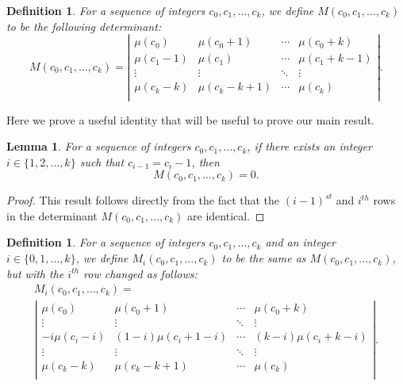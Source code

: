 \documentclass[12pt]{amsart}
\newtheorem{definition}[theorem]{Definition}
\newtheorem{lemma}[theorem]{Lemma}
\newcommand{\ifact}{\mu}
\newcommand{\M}{M}
\begin{document}
\begin{definition}
For a sequence of integers $c_0, c_1, \dots, c_k$, we define $\M(c_0, c_1, \dots, c_k)$ to be the following determinant:
$$
\M(c_0, c_1, \dots, c_k) = \left|
\begin{matrix}
\ifact(c_0) & \ifact(c_0+1) & \cdots & \ifact(c_0+k) \\
\ifact(c_1-1) & \ifact(c_1) & \cdots & \ifact(c_1+k-1) \\
\vdots & \vdots & \ddots & \vdots \\
\ifact(c_k-k) & \ifact(c_k-k+1) & \cdots & \ifact(c_k) \\
\end{matrix} \right|.
$$
\end{definition}

Here we prove a useful identity that will be useful to prove our main result.

\begin{lemma}
For a sequence of integers $c_0, c_1, \dots, c_k$, if there exists an integer $i \in \{1, 2, \dots, k\}$ such that $c_{i - 1} = c_{i} - 1$, then
$$
\M(c_0, c_1, \dots, c_k) = 0.
$$
\label{lem:mcornercase}
\end{lemma}

\begin{proof}
This result follows directly from the fact that the $(i-1)^{st}$ and $i^{th}$ rows in the determinant $\M(c_0, c_1, \dots, c_k)$ are identical.
\end{proof}

\begin{definition}
For a sequence of integers $c_0, c_1, \dots, c_k$ and an integer $i \in \{0,1,\dots,k\}$, we define $\M_i(c_0,c_1,\dots,c_k)$ to be the same as $\M(c_0, c_1, \dots, c_k)$, but with the $i^{th}$ row changed as follows:
\begin{multline*}
\M_i(c_0, c_1, \dots, c_k) = \\
\left|
\begin{matrix}
\ifact(c_0) & \ifact(c_0+1) & \cdots & \ifact(c_0+k) \\
\vdots & \vdots & \ddots & \vdots \\
-i\ifact(c_i-i) & (1-i)\ifact(c_i + 1 - i) & \cdots & (k-i) \ifact(c_i+k-i) \\
\vdots & \vdots & \ddots & \vdots \\
\ifact(c_k-k) & \ifact(c_k-k+1) & \cdots & \ifact(c_k) \\
\end{matrix} \right|.
\end{multline*}
\end{definition}
\end{document}
